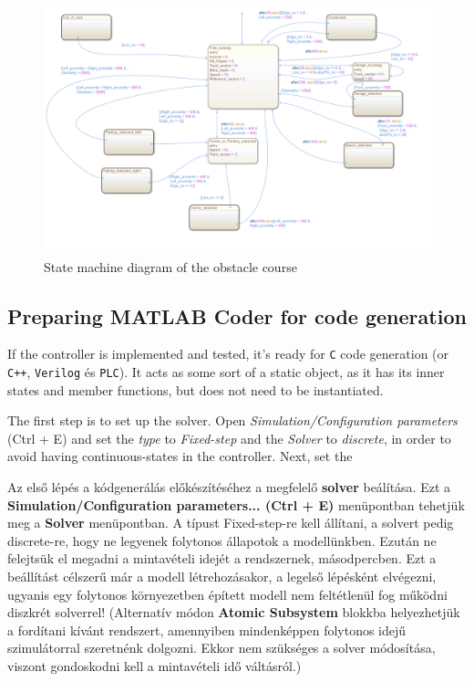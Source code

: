 \begin{figure}[!ht]
    \centering
    \includegraphics[width=\linewidth]{img/stateflow}
    \centering
    \caption{State machine diagram of the obstacle course}
    \label{fig:stateflow}
\end{figure}

\subsection{Preparing MATLAB Coder for code generation}

If the controller is implemented and tested, it's ready for \verb!C! code generation (or \verb!C++!, \verb!Verilog! és \verb!PLC!). It acts as some sort of a static object, as it has its inner states and member functions, but does not need to be instantiated.

The first step is to set up the solver. Open \emph{Simulation/Configuration parameters} (Ctrl + E) and set the \emph{type} to \emph{Fixed-step} and the \emph{Solver} to \emph{discrete}, in order to avoid having continuous-states in the controller. Next, set the 

Az első lépés a kódgenerálás előkészítéséhez a megfelelő \textbf{solver} beálítása. Ezt a \textbf{Simulation/Configuration parameters... (Ctrl + E)} menüpontban tehetjük meg a \textbf{Solver} menüpontban. A típust Fixed-step-re kell állítani, a solvert pedig discrete-re, hogy ne legyenek folytonos állapotok a modellünkben. Ezután ne felejtsük el megadni a mintavételi idejét a rendszernek, másodpercben.
Ezt a beállítást célszerű már a modell létrehozásakor, a legelső lépésként elvégezni, ugyanis egy folytonos környezetben épített modell nem feltétlenül fog működni diszkrét solverrel! (Alternatív módon \textbf{Atomic Subsystem} blokkba helyezhetjük a fordítani kívánt rendszert, amennyiben mindenképpen folytonos idejű szimulátorral szeretnénk dolgozni. Ekkor nem szükséges a solver módosítása, viszont gondoskodni kell a mintavételi idő váltásról.)

